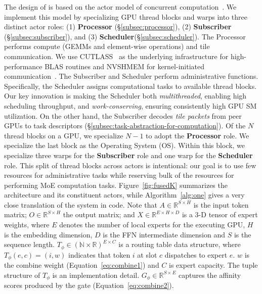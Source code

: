 The design of \sysname is based on the actor model of concurrent
computation~\cite{agha:85, 10.5555/1624775.1624804, Greif:75}.
We implement this model by specializing GPU thread blocks and warps into three distinct actor roles:
(1) \textbf{Processor} (\S\ref{subsec:processor}), (2) \textbf{Subscriber} (\S\ref{subsec:subscriber}),
and (3) \textbf{Scheduler}(\S\ref{subsec:scheduler}).
The Processor performs compute (GEMMs and element-wise operations) and tile communication.
We use CUTLASS~\cite{Thakkar_CUTLASS_2023} as the underlying infrastructure for high-performance
BLAS routines and NVSHMEM for kernel-initiated communication~\cite{nvshm}.
The Subscriber and Scheduler perform administrative functions.
Specifically, the Scheduler assigns computational tasks to available thread blocks.
Our key innovation is making the Scheduler both \emph{multithreaded},
enabling high scheduling throughput, and \emph{work-conserving}, ensuring consistently high GPU SM utilization.
On the other hand, the Subscriber decodes \emph{tile packets} from peer GPUs to task descriptors
(\S\ref{subsec:task-abstraction-for-computation}).
Of the $N$ thread blocks on a GPU, we specialize $N-1$ to adopt the \textbf{Processor} role.
We specialize the last block as the Operating System (OS).
Within this block, we specialize three warps for the \textbf{Subscriber} role and
one warp for the \textbf{Scheduler} role.
This split of thread blocks across actors is intentional: our goal is to use few resources for administrative
tasks while reserving bulk of the resources for performing MoE computation tasks.
Figure~\ref{fig:fusedK} summarizes the
\sysname architecture and its constituent actors, while Algorithm~\ref{alg:one} gives a very close translation of the
system in code.
Note that $A \in \mathbb{R}^{S \times H}$ is the input token matrix;
$O \in \mathbb{R}^{S \times H}$ the output matrix;
and $X \in \mathbb{R}^{E\times H \times D}$ is a 3-D tensor of expert weights,
where $E$ denotes the number of local experts for the executing GPU, $H$ is the embedding dimension,
$D$ is the FFN intermediate dimension and $S$ is the sequence length.
$T_{\phi} \in \left(\mathbb{N}\times\mathbb{R}\right)^{E \times C}$
is a routing table data structure, where $T_{\phi}\left( e, c\right) = (i, w)$ indicates that token $i$ at slot $c$
dispatches to expert $e$. $w$ is the combine weight (Equation~\ref{eq:combine1}) and $C$ is expert capacity.
The tuple structure of $T_{\phi}$ is an implementation detail. $G_{\phi} \in \mathbb{R}^{S \times E}$ captures
the affinity scores produced by the gate (Equation~\ref{eq:combine2}).
